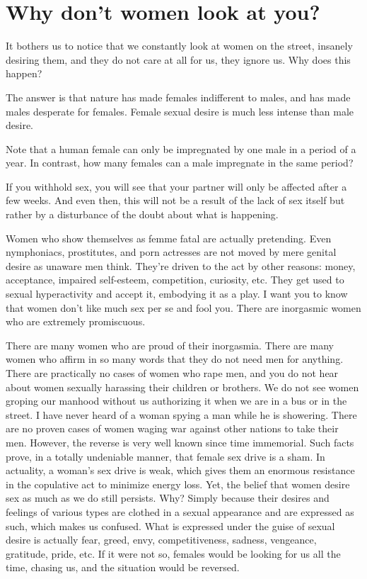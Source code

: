 \section{Why don't women look at you?}

\par It bothers us to notice that we constantly look at women on the street, insanely desiring them, and they do not care at all for us, they ignore us. Why does this happen?

\par The answer is that nature has made females indifferent to males, and has made males desperate for females. Female sexual desire is much less intense than male desire.

\par Note that a human female can only be impregnated by one male in a period of a year. In contrast, how many females can a male impregnate in the same period?

\par If you withhold sex, you will see that your partner will only be affected after a few weeks. And even then, this will not be a result of the lack of sex itself but rather by a disturbance of the doubt about what is happening.

\par Women who show themselves as femme fatal are actually pretending. Even nymphoniacs, prostitutes, and porn actresses are not moved by mere genital desire as unaware men think. They're driven to the act by other reasons: money, acceptance, impaired self-esteem, competition, curiosity, etc. They get used to sexual hyperactivity and accept it, embodying it as a play. I want you to know that women don't like much sex per se and fool you. There are inorgasmic women who are extremely promiscuous.

\par There are many women who are proud of their inorgasmia. There are many women who affirm in so many words that they do not need men for anything. There are practically no cases of women who rape men, and you do not hear about women sexually harassing their children or brothers. We do not see women groping our manhood without us authorizing it when we are in a bus or in the street. I have never heard of a woman spying a man while he is showering. There are no proven cases of women waging war against other nations to take their men. However, the reverse is very well known since time immemorial. Such facts prove, in a totally undeniable manner, that female sex drive is a sham. In actuality, a woman's sex drive is weak, which gives them an enormous resistance in the copulative act to minimize energy loss. Yet, the belief that women desire sex as much as we do still persists. Why? Simply because their desires and feelings of various types are clothed in a sexual appearance and are expressed as such, which makes us confused. What is expressed under the guise of sexual desire is actually fear, greed, envy, competitiveness, sadness, vengeance, gratitude, pride, etc. If it were not so, females would be looking for us all the time, chasing us, and the situation would be reversed.

